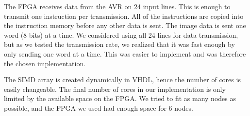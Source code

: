 The \ac{FPGA} receives data from the AVR on 24 input lines. This is enough to
transmit one instruction per transmission. All of the instructions are copied
into the instruction memory before any other data is sent. The image data is
sent one word (8 bits) at a time. We considered using all 24 lines for data
transmission, but as we tested the transmission rate, we realized that it was
fast enough by only sending one word at a time. This was easier to
implement and was therefore the chosen implementation.

The \ac{SIMD} array is created dynamically in \ac{VHDL}, hence the number of
cores is easily changeable. The final number of cores in our implementation
is only limited by the available space on the \ac{FPGA}. We tried to fit as many
nodes as possible, and the \ac{FPGA} we used had enough space for 6 nodes.
